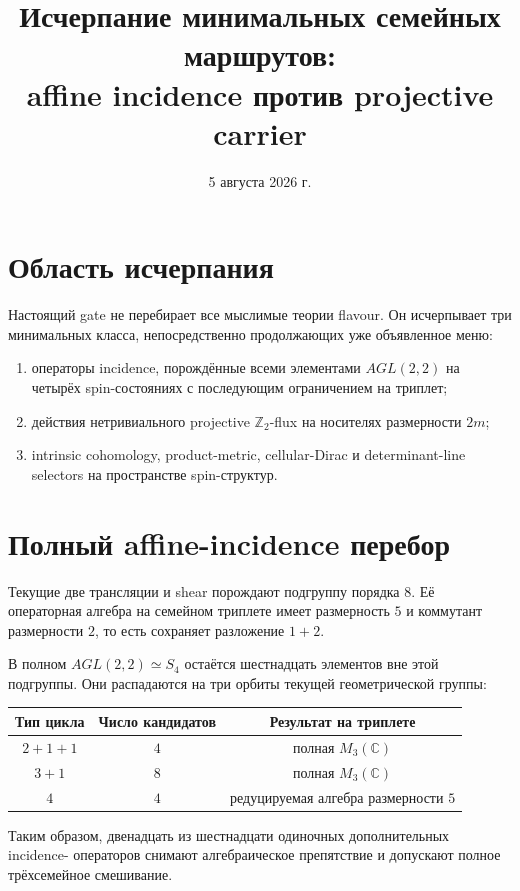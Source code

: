 \documentclass[12pt,a4paper]{article}
\title{Исчерпание минимальных семейных маршрутов:\\
affine incidence против projective carrier}
\author{}
\date{5 августа 2026 г.}
\begin{document}
\maketitle

\section{Область исчерпания}

Настоящий gate не перебирает все мыслимые теории flavour. Он исчерпывает три
минимальных класса, непосредственно продолжающих уже объявленное меню:
\begin{enumerate}
 \item операторы incidence, порождённые всеми элементами $AGL(2,2)$ на
 четырёх spin-состояниях с последующим ограничением на триплет;
 \item действия нетривиального projective $\mathbb Z_2$-flux на носителях
 размерности $2m$;
 \item intrinsic cohomology, product-metric, cellular-Dirac и determinant-line
 selectors на пространстве spin-структур.
\end{enumerate}

\section{Полный affine-incidence перебор}

Текущие две трансляции и shear порождают подгруппу порядка $8$. Её операторная
алгебра на семейном триплете имеет размерность $5$ и коммутант размерности $2$,
то есть сохраняет разложение $1+2$.

В полном $AGL(2,2)\simeq S_4$ остаётся шестнадцать элементов вне этой
подгруппы. Они распадаются на три орбиты текущей геометрической группы:
\begin{center}
\begin{tabular}{ccc}
\toprule
Тип цикла & Число кандидатов & Результат на триплете \\
\midrule
$2+1+1$ & $4$ & полная $M_3(\mathbb C)$ \\
$3+1$ & $8$ & полная $M_3(\mathbb C)$ \\
$4$ & $4$ & редуцируемая алгебра размерности $5$ \\
\bottomrule
\end{tabular}
\end{center}
Таким образом, двенадцать из шестнадцати одиночных дополнительных incidence-
операторов снимают алгебраическое препятствие и допускают полное трёхсемейное
смешивание.
\end{document}
